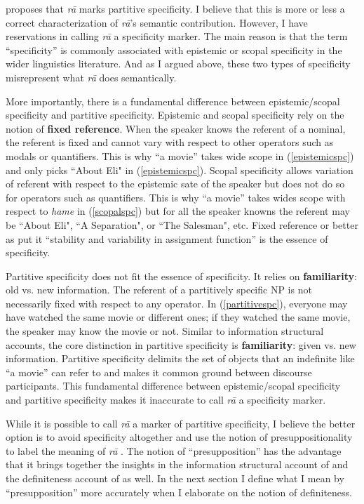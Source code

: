 \documentclass[12pt]{article}
\begin{document}
\cite{karimi2003object} proposes that \emph{r\={a}} marks partitive specificity. I believe that this is more or less a correct characterization of \emph{r\={a}}'s semantic contribution. However, I have reservations in calling \emph{r\={a}} a specificity marker. The main reason is that the term ``specificity'' is commonly associated with epistemic or scopal specificity in the wider linguistics literature. And as I argued above, these two types of specificity misrepresent what \emph{r\={a}} does semantically. 

More importantly, there is a fundamental difference between epistemic/scopal specificity and partitive specificity. Epistemic and scopal specificity rely on the notion of \textbf{fixed reference}. When the speaker knows the referent of a nominal, the referent is fixed and cannot vary with respect to other operators such as modals or quantifiers. This is why ``a movie'' takes wide scope in (\ref{epistemicspc}) and only picks ``About Eli" in (\ref{epistemicspc}). Scopal specificity allows variation of referent with respect to the epistemic sate of the speaker but does not do so for operators such as quantifiers. This is why ``a movie'' takes wides scope with respect to \emph{hame} in (\ref{scopalspc}) but for all the speaker knowns the referent may be ``About Eli", ``A Separation", or ``The Salesman", etc. Fixed reference or better as \cite{farkas2013typology} put it ``stability and variability in assignment function'' is the essence of specificity. 

Partitive specificity does not fit the essence of specificity. It relies on \textbf{familiarity}: old vs. new information. The referent of a partitively specific NP is not necessarily fixed with respect to any operator. In (\ref{partitivespc}), everyone may have watched the same movie or different ones; if they watched the same movie, the speaker may know the movie or not. Similar to information structural accounts, the core distinction in partitive specificity is \textbf{familiarity}: given vs. new information. Partitive specificity delimits the set of objects that an indefinite like ``a movie'' can refer to and makes it common ground between discourse participants. This fundamental difference between epistemic/scopal specificity and partitive specificity makes it inaccurate to call \emph{r\={a}} a specificity marker. 

While it is possible to call \emph{r\={a}} a marker of partitive specificity, I believe the better option is to avoid specificity altogether and use the notion of presuppositionality to label the meaning of \emph{r\={a}} \citep{ghomeshi1996}. The notion of ``presupposition'' has the advantage that it brings together the insights in the information structural account of \cite{dabir1992dependence} and the definiteness account of \cite{mahootian1997} as well. In the next section I define what I mean by ``presupposition'' more accurately when I elaborate on the notion of definiteness.  
\end{document}
